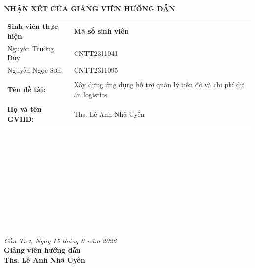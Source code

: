 \newpage
{}
{}

\begin{center}
    \textbf{\Large NHẬN XÉT CỦA GIẢNG VIÊN HƯỚNG DẪN}
\end{center}

\vspace{1cm}

\begin{table}[h]
\begin{tabular}{ll}
\textbf{Sinh viên thực hiện} & \textbf{Mã số sinh viên} \\
Nguyễn Trường Duy            & CNTT2311041              \\
Nguyễn Ngọc Sơn              & CNTT2311095             \\

                           &                          \\
\textbf{Tên đề tài:}       & Xây dựng ứng dụng hỗ trợ quản lý tiến độ và chi phí dự án logistics \\
                           &                          \\
\textbf{Họ và tên GVHD:}   & Ths. Lê Anh Nhã Uyên     \\
\end{tabular}
\end{table}

\vspace{0.5cm}
\noindent\makebox[\linewidth]{\dotfill} \\
\noindent\makebox[\linewidth]{\dotfill} \\
\noindent\makebox[\linewidth]{\dotfill} \\
\noindent\makebox[\linewidth]{\dotfill} \\
\noindent\makebox[\linewidth]{\dotfill} \\
\noindent\makebox[\linewidth]{\dotfill} \\
\noindent\makebox[\linewidth]{\dotfill} \\
\noindent\makebox[\linewidth]{\dotfill} \\
\noindent\makebox[\linewidth]{\dotfill} \\
\noindent\makebox[\linewidth]{\dotfill} \\
\noindent\makebox[\linewidth]{\dotfill}

\vspace{1cm}

\begin{flushright}
    \textit{Cần Thơ, Ngày 15 tháng 8 năm 2026} \\
    \textbf{Giảng viên hướng dẫn} \\
    \vspace{2cm}
    \textbf{Ths. Lê Anh Nhã Uyên}
\end{flushright}